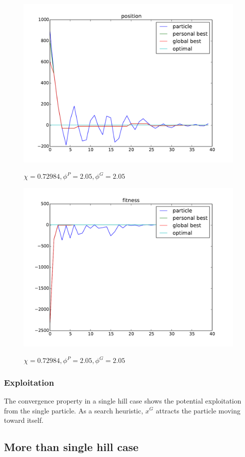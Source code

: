 \begin{figure}[ht]
\centering
\includegraphics[width=.7\linewidth]{./simfig/case1/position1-2} 
\label{fig:case1-2:position}
\caption{$ \chi = 0.72984 , \phi^{P} = 2.05 , \phi^{G} = 2.05 $ }
\end{figure}
  
\begin{figure}[ht]
\centering
\includegraphics[width=.7\linewidth]{./simfig/case1/fitness1-2} 
\label{fig:case1-2:fitness} 
\caption{$ \chi = 0.72984 , \phi^{P} = 2.05 , \phi^{G} = 2.05 $ }
\end{figure}

\subsubsection{Exploitation}

The convergence property in a single hill case shows the potential exploitation from the single particle.
As a search heuristic, $ x^{G} $ attracts the particle moving toward itself.


\subsection{More than single hill case}

